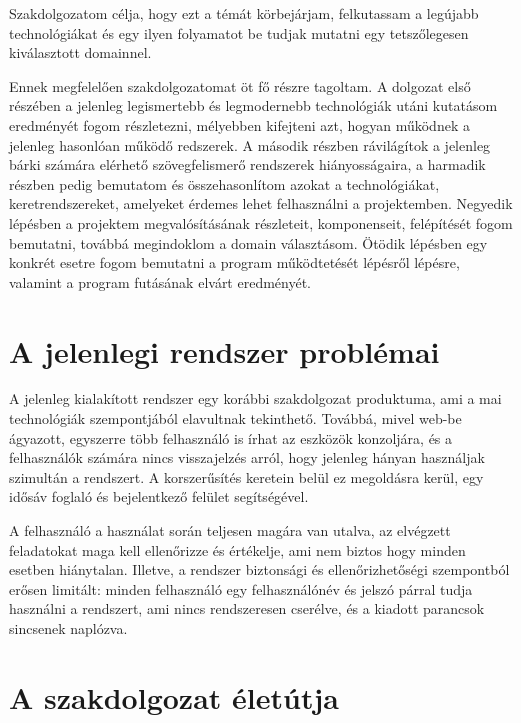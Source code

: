\documentclass[12pt]{report}
\begin{document}
Szakdolgozatom célja, hogy ezt a témát körbejárjam, felkutassam a legújabb technológiákat és egy ilyen folyamatot be tudjak mutatni egy tetszőlegesen kiválasztott domainnel.

Ennek megfelelően szakdolgozatomat öt fő részre tagoltam. A dolgozat első részében a jelenleg legismertebb és legmodernebb technológiák utáni kutatásom eredményét fogom részletezni, mélyebben kifejteni azt, hogyan működnek a jelenleg hasonlóan működő redszerek. A második részben rávilágítok a jelenleg bárki számára elérhető szövegfelismerő rendszerek hiányosságaira, a harmadik részben pedig bemutatom és összehasonlítom azokat a technológiákat, keretrendszereket, amelyeket érdemes lehet felhasználni a projektemben. Negyedik lépésben a projektem megvalósításának részleteit, komponenseit, felépítését fogom bemutatni, továbbá megindoklom a domain választásom. Ötödik lépésben egy konkrét esetre fogom bemutatni a program működtetését lépésről lépésre, valamint a program futásának elvárt eredményét.




\chapter{A jelenlegi rendszer problémai}


A jelenleg kialakított rendszer egy korábbi szakdolgozat produktuma, ami a mai technológiák szempontjából elavultnak tekinthető. Továbbá, mivel web-be ágyazott, egyszerre több felhasználó is írhat az eszközök konzoljára, és a felhasználók számára nincs visszajelzés arról, hogy jelenleg hányan használjak szimultán a rendszert. A korszerűsítés keretein belül ez megoldásra kerül, egy idősáv foglaló és bejelentkező felület segítségével.

A felhasználó a használat során teljesen magára van utalva, az elvégzett feladatokat maga kell ellenőrizze és értékelje, ami nem biztos hogy minden esetben hiánytalan. 
Illetve, a rendszer biztonsági és ellenőrizhetőségi szempontból erősen limitált: minden felhasználó egy felhasználónév és jelszó párral tudja használni a rendszert, ami nincs rendszeresen cserélve, és a kiadott parancsok sincsenek naplózva.


\chapter{A szakdolgozat életútja}
\end{document}
